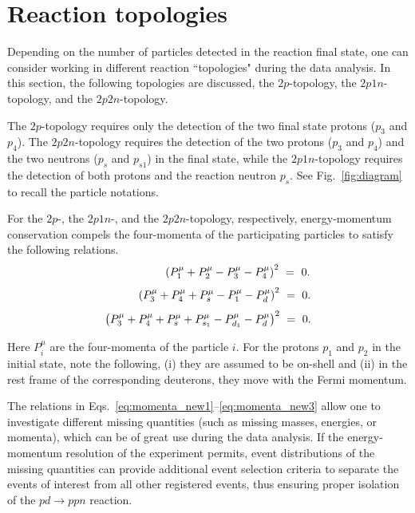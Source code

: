\section{Reaction topologies}
\label{sec:topologies}

Depending on the number of particles detected in the reaction final state, one can consider working in different reaction ``topologies" during the data analysis. In this section, the following topologies are discussed, the $2p$-topology, the $2p1n$-topology, and the $2p2n$-topology.

The $2p$-topology requires only the detection of the two final state protons ($p_{3}$ and $p_{4}$). The $2p2n$-topology requires the detection of the two protons ($p_{3}$ and $p_{4}$) and the two neutrons ($p_{s}$ and $p_{s1}$) in the final state, while the $2p1n$-topology requires the detection of both protons and the reaction neutron $p_{s}$. See Fig.~\ref{fig:diagram} to recall the particle notations. 



For the $2p$-, the $2p1n$-, and the $2p2n$-topology, respectively, energy-momentum conservation compels the four-momenta of the participating particles to satisfy the following relations.
\begin{equation}
~~~~~~~~~~~~~~~~\left( P_{1}^{\mu}+P_{2}^{\mu}-P_{3}^{\mu} - P_{4}^{\mu} \right)^2~=~0.\\
\label{eq:momenta_new1}
\end{equation}
\begin{equation}
~~~~~~~~~\left( P_{3}^{\mu}+P_{4}^{\mu}+P_{s}^{\mu} -P_{1}^{\mu} -P_{d}^{\mu} \right)^2~=~0.\\
\label{eq:momenta_new2}
\end{equation}
\begin{equation}
\left( P_{3}^{\mu}+P_{4}^{\mu}+P_{s}^{\mu} + P_{s_{1}}^{\mu} - P_{d_{1}}^{\mu}-P_{d}^{\mu}\right)^2~=~0.\\
\label{eq:momenta_new3}
\end{equation}

Here $P_{i}^{\mu}$ are the four-momenta of the particle $i$. For the protons $p_{1}$ and $p_{2}$ in the initial state, note the following, (i) they are assumed to be on-shell and (ii) in the rest frame of the corresponding deuterons, they move with the Fermi momentum.
 

The relations in Eqs.~\eqref{eq:momenta_new1}--\eqref{eq:momenta_new3} allow one to investigate different missing quantities (such as missing masses, energies, or momenta), which can be of great use during the data analysis. If the energy-momentum resolution of the experiment permits, event distributions of the missing quantities can provide additional event selection criteria to separate the events of interest from all other registered events, thus ensuring proper isolation of the $pd\rightarrow ppn$ reaction.

